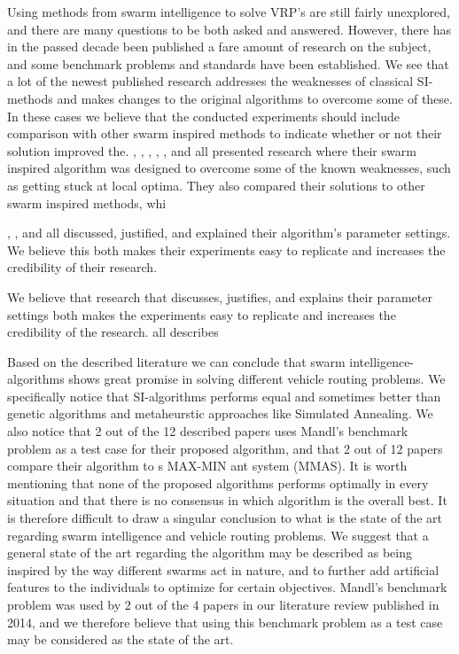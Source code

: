 Using methods from swarm intelligence to solve VRP's are still fairly unexplored, and there are many questions to be both asked and answered. However, there has in the passed decade been published a fare amount of research on the subject, and some benchmark problems and standards have been established. We see that a lot of the newest published research addresses the weaknesses of classical SI-methods and makes changes to the original algorithms to overcome some of these. In these cases we believe that the conducted experiments should include comparison with other swarm inspired methods to indicate whether or not their solution improved the. \citet{tripathi09}, \citet{yang07}, \citet{salehinejad10}, \citet{jiang10}, \citet{nikolic14}, and \citet{kechagiopoulos14} all presented research where their swarm inspired algorithm was designed to overcome some of the known weaknesses, such as getting stuck at local optima. They also compared their solutions to other swarm inspired methods, whi

\citet{sedighpour14}, \citet{poorzahedy11}, and \citet{kechagiopoulos14} all discussed, justified, and explained their algorithm's parameter settings. We believe this both makes their experiments easy to replicate and increases the credibility of their research.

 We believe that research that discusses, justifies, and explains their parameter settings both makes the experiments easy to replicate and increases the credibility of the research. all describes


Based on the described literature we can conclude that swarm intelligence-algorithms shows great promise in solving different vehicle routing problems. We specifically notice that SI-algorithms performs equal and sometimes better than genetic algorithms and  metaheurstic approaches like Simulated Annealing. We also notice that 2 out of the 12 described papers uses Mandl's benchmark problem as a test case for their proposed algorithm, and that 2 out of 12 papers compare their algorithm to \citet{stutzle99}s MAX-MIN ant system (MMAS). It is worth mentioning that none of the proposed algorithms performs optimally in every situation and that there is no consensus in which algorithm is the overall best. It is therefore difficult to draw a singular conclusion to what is the state of the art regarding swarm intelligence and vehicle routing problems. We suggest that a general state of the art regarding the algorithm may be described as being inspired by the way different swarms act in nature, and to further add artificial features to the individuals to optimize for certain objectives. Mandl's benchmark problem was used by 2 out of the 4 papers in our literature review published in 2014, and we therefore believe that using this benchmark problem as a test case may be considered as the state of the art.



